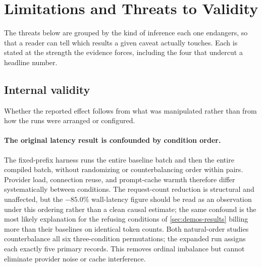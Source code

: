 \begin{table}[t]
  \centering
  \caption{Gate-frontier study outcomes by repository. ``Nonzero coverage in sweep''
  lists every value the frozen $\Lambda$ grid produces for the learned gate before
  threshold selection; the support-only ablation ($\alpha=1$) produces the identical
  sweep and admission on every repository.}
  \label{tab:gate-frontier}
  \footnotesize
  \resizebox{\columnwidth}{!}{}
\end{table}

\section{Limitations and Threats to Validity}
\label{sec:limits}

The threats below are grouped by the kind of inference each one endangers, so that a
reader can tell which results a given caveat actually touches.  Each is stated at the
strength the evidence forces, including the four that undercut a headline number.

\subsection{Internal validity}

Whether the reported effect follows from what was manipulated rather than from how the runs were arranged or configured.

\paragraph{The original latency result is confounded by condition order.}
The fixed-prefix harness runs the entire baseline batch and then the entire compiled batch, without
randomizing or counterbalancing order within pairs.  Provider load, connection reuse, and
prompt-cache warmth therefore differ systematically between conditions.  The request-count
reduction is structural and unaffected, but the $-85.0\%$ wall-latency figure should be
read as an observation under this ordering rather than a clean causal estimate; the same
confound is the most likely explanation for the refusing conditions of
\cref{sec:demos-results} billing more than their baselines on identical token counts.
Both natural-order studies counterbalance all six three-condition permutations; the
expanded run assigns each exactly five primary records.  This removes ordinal imbalance
but cannot eliminate provider noise or cache interference.


